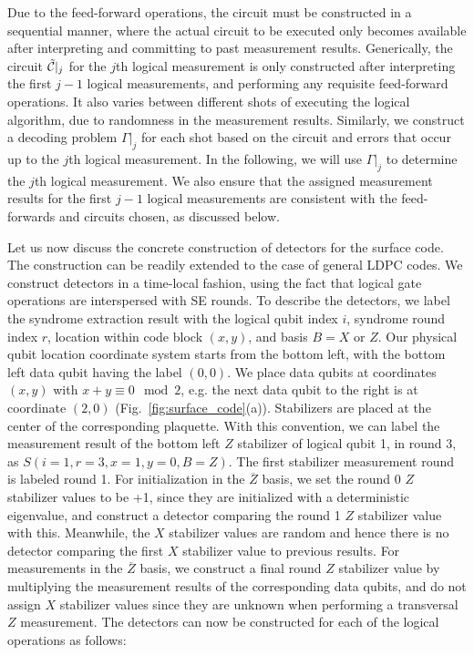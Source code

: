 Due to the feed-forward operations, the circuit must be constructed in a sequential manner, where the actual circuit to be executed only becomes available after interpreting and committing to past measurement results.
%
Generically, the circuit $\tilde{\mathcal{C}}|_j$ for the $j$th logical measurement is only constructed after interpreting the first $j-1$ logical measurements, and performing any requisite feed-forward operations.
%
It also varies between different shots of executing the logical algorithm, due to randomness in the measurement results.
%
Similarly, we construct a decoding problem $\Gamma|_j$ for each shot based on the circuit and errors that occur up to the $j$th logical measurement.
%
In the following, we will use $\Gamma|_j$ to determine the $j$th logical measurement.
%
We also ensure that the assigned measurement results for the first $j-1$ logical measurements are consistent with the feed-forwards and circuits chosen, as discussed below.

Let us now discuss the concrete construction of detectors for the surface code.
%
The construction can be readily extended to the case of general LDPC codes.
%
We construct detectors in a time-local fashion, using the fact that logical gate operations are interspersed with SE rounds.
%
To describe the detectors, we label the syndrome extraction result with the logical qubit index $i$, syndrome round index $r$, location within code block $(x,y)$, and basis $B=X$ or $Z$.
%
Our physical qubit location coordinate system starts from the bottom left, with the bottom left data qubit having the label $(0,0)$.
%
We place data qubits at coordinates $(x,y)$ with $x+y\equiv 0\mod 2$, e.g. the next data qubit to the right is at coordinate $(2,0)$ (Fig.~\ref{fig:surface_code}(a)).
%
Stabilizers are placed at the center of the corresponding plaquette.
%
With this convention, we can label the measurement result of the bottom left $Z$ stabilizer of logical qubit 1, in round 3, as $S(i=1,r=3,x=1,y=0,B=Z)$.
%
The first stabilizer measurement round is labeled round 1.
%
For initialization in the $\overline{Z}$ basis, we set the round 0 $Z$ stabilizer values to be +1, since they are initialized with a deterministic eigenvalue, and construct a detector comparing the round 1 $Z$ stabilizer value with this.
%
Meanwhile, the $X$ stabilizer values are random and hence there is no detector comparing the first $X$ stabilizer value to previous results.
%
For measurements in the $\overline{Z}$ basis, we construct a final round $Z$ stabilizer value by multiplying the measurement results of the corresponding data qubits, and do not assign $X$ stabilizer values since they are unknown when performing a transversal $Z$ measurement.
%
The detectors can now be constructed for each of the logical operations as follows:

